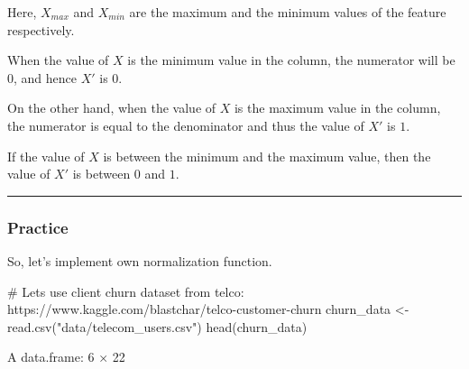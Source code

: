\documentclass[
  letterpaper,
  DIV=11,
  numbers=noendperiod]{scrreprt}
\newenvironment{Shaded}{\begin{snugshade}}{\end{snugshade}}
\newcommand{\CommentTok}[1]{\textcolor[rgb]{0.37,0.37,0.37}{#1}}
\newcommand{\FunctionTok}[1]{\textcolor[rgb]{0.28,0.35,0.67}{#1}}
\newcommand{\NormalTok}[1]{\textcolor[rgb]{0.00,0.23,0.31}{#1}}
\newcommand{\OtherTok}[1]{\textcolor[rgb]{0.00,0.23,0.31}{#1}}
\newcommand{\StringTok}[1]{\textcolor[rgb]{0.13,0.47,0.30}{#1}}
\begin{document}
Here, \(X_{max}\) and \(X_{min}\) are the maximum and the minimum values
of the feature respectively.

When the value of \(X\) is the minimum value in the column, the
numerator will be \(0\), and hence \(X'\) is \(0\).

On the other hand, when the value of \(X\) is the maximum value in the
column, the numerator is equal to the denominator and thus the value of
\(X'\) is \(1\).

If the value of \(X\) is between the minimum and the maximum value, then
the value of \(X'\) is between \(0\) and \(1\).

\begin{center}\rule{0.5\linewidth}{0.5pt}\end{center}

\subsubsection{Practice}\label{practice}

So, let's implement own normalization function.

\begin{Shaded}
\begin{Highlighting}[]
\CommentTok{\# Lets use client churn dataset from telco: https://www.kaggle.com/blastchar/telco{-}customer{-}churn}
\NormalTok{churn\_data }\OtherTok{\textless{}{-}} \FunctionTok{read.csv}\NormalTok{(}\StringTok{"data/telecom\_users.csv"}\NormalTok{)}
\FunctionTok{head}\NormalTok{(churn\_data)}
\end{Highlighting}
\end{Shaded}

A data.frame: 6 × 22
\end{document}
